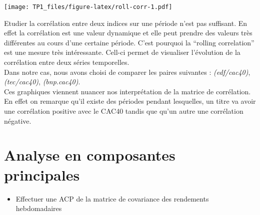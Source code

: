 \documentclass[
]{article}
\newenvironment{Shaded}{\begin{snugshade}}{\end{snugshade}}
\newcommand{\CommentTok}[1]{\textcolor[rgb]{0.56,0.35,0.01}{\textit{#1}}}
\newcommand{\DecValTok}[1]{\textcolor[rgb]{0.00,0.00,0.81}{#1}}
\newcommand{\FloatTok}[1]{\textcolor[rgb]{0.00,0.00,0.81}{#1}}
\newcommand{\FunctionTok}[1]{\textcolor[rgb]{0.00,0.00,0.00}{#1}}
\newcommand{\NormalTok}[1]{#1}
\newcommand{\OtherTok}[1]{\textcolor[rgb]{0.56,0.35,0.01}{#1}}
\newcommand{\SpecialCharTok}[1]{\textcolor[rgb]{0.00,0.00,0.00}{#1}}
\newcommand{\StringTok}[1]{\textcolor[rgb]{0.31,0.60,0.02}{#1}}
\providecommand{\tightlist}{%
  \setlength{\itemsep}{0pt}\setlength{\parskip}{0pt}}
\begin{document}
\texttt{[image: TP1\_files/figure-latex/roll-corr-1.pdf]}

Etudier la corrélation entre deux indices sur une période n'est pas
suffisant. En effet la corrélation est une valeur dynamique et elle peut
prendre des valeurs très différentes au cours d'une certaine période.
C'est pourquoi la ``rolling correlation'' est une mesure très
intéressante. Cell-ci permet de visualiser l'évolution de la corrélation
entre deux séries temporelles.\\
Dans notre cas, nous avons choisi de comparer les paires suivantes :
\emph{(edf/cac40)}, \emph{(tec/cac40)}, \emph{(bnp.cac40)}.\\
Ces graphiques viennent nuancer nos interprétation de la matrice de
corrélation. En effet on remarque qu'il existe des périodes pendant
lesquelles, un titre va avoir une corrélation positive avec le CAC40
tandis que qu'un autre une corrélation négative.

\hypertarget{analyse-en-composantes-principales}{%
\section{Analyse en composantes
principales}\label{analyse-en-composantes-principales}}

\begin{itemize}
\tightlist
\item
  Effectuer une ACP de la matrice de covariance des rendements
  hebdomadaires
\end{itemize}

\begin{Shaded}
\end{Shaded}
\end{document}
